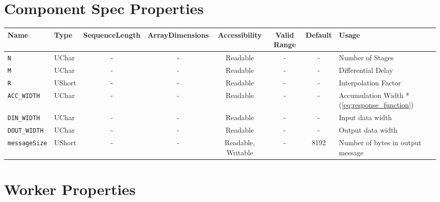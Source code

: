 \documentclass{article}
\begin{document}
\begin{landscape}
	\section*{Component Spec Properties}
	\begin{scriptsize}
		\begin{tabular}{|p{3cm}|p{1.5cm}|c|c|c|c|c|p{7cm}|}
			\hline
			\rowcolor{blue}
			Name                      & Type   & SequenceLength & ArrayDimensions & Accessibility      & Valid Range & Default & Usage                                            \\
			\hline \verb+N+           & UChar  & -              & -               & Readable           & -           & -       & Number of Stages                                 \\
			\hline \verb+M+           & UChar  & -              & -               & Readable           & -           & -       & Differential Delay                               \\
			\hline \verb+R+           & UShort & -              & -               & Readable           & -           & -       & Interpolation Factor                             \\
			\hline \verb+ACC_WIDTH+   & UChar  & -              & -               & Readable           & -           & -       & Accumulation Width *(\ref{eq:response_function}) \\
			\hline \verb+DIN_WIDTH+   & UChar  & -              & -               & Readable           & -           & -       & Input data width                                 \\
			\hline \verb+DOUT_WIDTH+  & UChar  & -              & -               & Readable           & -           & -       & Output data width                                \\
			\hline \verb+messageSize+ & UShort & -              & -               & Readable, Writable & -           & 8192    & Number of bytes in output message                \\
			\hline
		\end{tabular}
	\end{scriptsize}
	\section*{Worker Properties}


\end{landscape}
\end{document}
